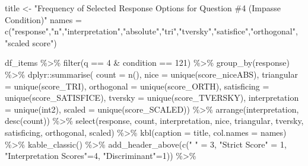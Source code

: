 \documentclass[
  letterpaper,
  DIV=11,
  numbers=noendperiod]{scrreprt}
\newenvironment{Shaded}{\begin{snugshade}}{\end{snugshade}}
\newcommand{\AttributeTok}[1]{\textcolor[rgb]{0.40,0.45,0.13}{#1}}
\newcommand{\DecValTok}[1]{\textcolor[rgb]{0.68,0.00,0.00}{#1}}
\newcommand{\FunctionTok}[1]{\textcolor[rgb]{0.28,0.35,0.67}{#1}}
\newcommand{\NormalTok}[1]{\textcolor[rgb]{0.00,0.23,0.31}{#1}}
\newcommand{\OtherTok}[1]{\textcolor[rgb]{0.00,0.23,0.31}{#1}}
\newcommand{\SpecialCharTok}[1]{\textcolor[rgb]{0.37,0.37,0.37}{#1}}
\newcommand{\StringTok}[1]{\textcolor[rgb]{0.13,0.47,0.30}{#1}}
\begin{document}
\begin{Shaded}
\begin{Highlighting}[]
\NormalTok{title }\OtherTok{\textless{}{-}} \StringTok{"Frequency of Selected Response Options for Question \#4 (Impasse Condition)"}
\NormalTok{names }\OtherTok{=} \FunctionTok{c}\NormalTok{(}\StringTok{"response"}\NormalTok{,}\StringTok{"n"}\NormalTok{,}\StringTok{"interpretation"}\NormalTok{,}\StringTok{"absolute"}\NormalTok{,}\StringTok{"tri"}\NormalTok{,}\StringTok{"tversky"}\NormalTok{,}\StringTok{"satisfice"}\NormalTok{,}\StringTok{"orthogonal"}\NormalTok{, }\StringTok{"scaled score"}\NormalTok{)}

\NormalTok{df\_items }\SpecialCharTok{\%\textgreater{}\%} \FunctionTok{filter}\NormalTok{(q }\SpecialCharTok{==} \DecValTok{4} \SpecialCharTok{\&}\NormalTok{ condition }\SpecialCharTok{==} \DecValTok{121}\NormalTok{) }\SpecialCharTok{\%\textgreater{}\%} \FunctionTok{group\_by}\NormalTok{(response) }\SpecialCharTok{\%\textgreater{}\%} 
\NormalTok{  dplyr}\SpecialCharTok{::}\FunctionTok{summarise}\NormalTok{( }\AttributeTok{count =} \FunctionTok{n}\NormalTok{(), }
                    \AttributeTok{nice =} \FunctionTok{unique}\NormalTok{(score\_niceABS),}
                    \AttributeTok{triangular =} \FunctionTok{unique}\NormalTok{(score\_TRI), }
                    \AttributeTok{orthogonal =}  \FunctionTok{unique}\NormalTok{(score\_ORTH),}
                    \AttributeTok{satisficing =}  \FunctionTok{unique}\NormalTok{(score\_SATISFICE),}
                    \AttributeTok{tversky =} \FunctionTok{unique}\NormalTok{(score\_TVERSKY),}
                    \AttributeTok{interpretation =} \FunctionTok{unique}\NormalTok{(int2),}
                    \AttributeTok{scaled =} \FunctionTok{unique}\NormalTok{(score\_SCALED)) }\SpecialCharTok{\%\textgreater{}\%} 
  \FunctionTok{arrange}\NormalTok{(interpretation, }\FunctionTok{desc}\NormalTok{(count)) }\SpecialCharTok{\%\textgreater{}\%} 
  \FunctionTok{select}\NormalTok{(response, count, interpretation, nice, }
\NormalTok{         triangular, tversky, satisficing, orthogonal, scaled) }\SpecialCharTok{\%\textgreater{}\%} 
  \FunctionTok{kbl}\NormalTok{(}\AttributeTok{caption =}\NormalTok{ title, }\AttributeTok{col.names =}\NormalTok{ names) }\SpecialCharTok{\%\textgreater{}\%}  \FunctionTok{kable\_classic}\NormalTok{() }\SpecialCharTok{\%\textgreater{}\%} 
  \FunctionTok{add\_header\_above}\NormalTok{(}\FunctionTok{c}\NormalTok{(}\StringTok{" "} \OtherTok{=} \DecValTok{3}\NormalTok{, }\StringTok{"Strict Score"} \OtherTok{=} \DecValTok{1}\NormalTok{, }\StringTok{"Interpretation Scores"}\OtherTok{=}\DecValTok{4}\NormalTok{, }\StringTok{"Discriminant"}\OtherTok{=}\DecValTok{1}\NormalTok{)) }\SpecialCharTok{\%\textgreater{}\%}

\end{Highlighting}
\end{Shaded}
\end{document}
